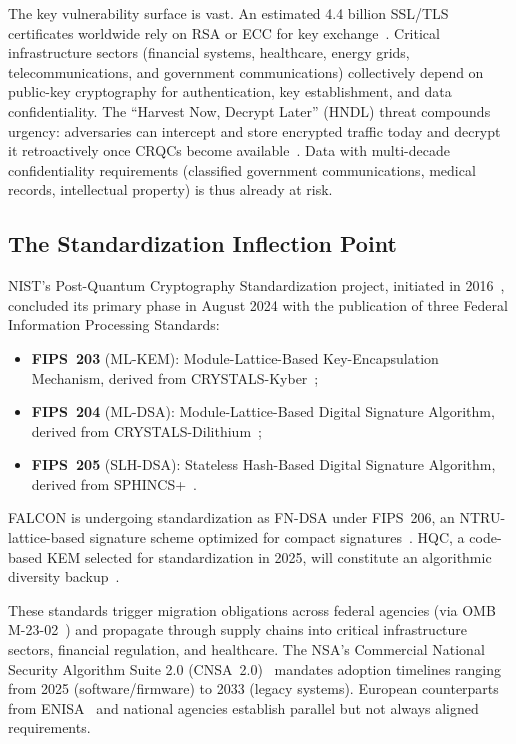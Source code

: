 \documentclass[journal]{IEEEtran}
\begin{document}
The key vulnerability surface is vast. An estimated 4.4 billion SSL/TLS
certificates worldwide rely on RSA or ECC for key exchange~\cite{netcraft2024survey}.
Critical infrastructure sectors (financial systems, healthcare, energy grids,
telecommunications, and government communications) collectively depend on
public-key cryptography for authentication, key establishment, and data
confidentiality. The ``Harvest Now, Decrypt Later'' (HNDL) threat
compounds urgency: adversaries can intercept and store encrypted traffic
today and decrypt it retroactively once CRQCs become available~\cite{chen2016report,
nsasuite2022}. Data with multi-decade confidentiality requirements (classified
government communications, medical records, intellectual property) is thus
already at risk.

\subsection{The Standardization Inflection Point}

NIST's Post-Quantum Cryptography Standardization project, initiated in
2016~\cite{nist2016call}, concluded its primary phase in August 2024 with the
publication of three Federal Information Processing Standards:
\begin{itemize}
  \item \textbf{FIPS~203} (ML-KEM): Module-Lattice-Based Key-Encapsulation
  Mechanism, derived from CRYSTALS-Kyber~\cite{nistfips203};
  \item \textbf{FIPS~204} (ML-DSA): Module-Lattice-Based Digital Signature
  Algorithm, derived from CRYSTALS-Dilithium~\cite{nistfips204};
  \item \textbf{FIPS~205} (SLH-DSA): Stateless Hash-Based Digital Signature
  Algorithm, derived from SPHINCS+~\cite{nistfips205}.
\end{itemize}
FALCON is undergoing standardization as FN-DSA under FIPS~206, an NTRU-lattice-based
signature scheme optimized for compact signatures~\cite{nistfips206}.
HQC, a code-based KEM selected for standardization in 2025, will constitute
an algorithmic diversity backup~\cite{aragon2022hqc}.

These standards trigger migration obligations across federal agencies
(via OMB M-23-02~\cite{omb2023m2302}) and propagate through supply chains
into critical infrastructure sectors, financial regulation, and healthcare.
The NSA's Commercial National Security Algorithm Suite 2.0 (CNSA~2.0)~\cite{nsacnsa2022}
mandates adoption timelines ranging from 2025 (software/firmware) to 2033
(legacy systems). European counterparts from ENISA~\cite{enisa2022pqc} and
national agencies establish parallel but not always aligned requirements.
\end{document}
